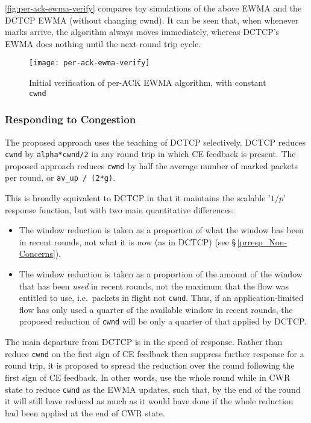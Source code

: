 \autoref{fig:per-ack-ewma-verify} compares toy simulations of the above EWMA and the DCTCP EWMA (without changing cwnd). It can be seen that, when whenever marks arrive, the algorithm always moves immediately, whereas DCTCP's EWMA does nothing until the next round trip cycle.
\begin{figure}
	\texttt{[image: per-ack-ewma-verify]}
	\caption{Initial verification of per-ACK EWMA algorithm, with constant \texttt{cwnd}}\label{fig:per-ack-ewma-verify}
\end{figure}

\subsubsection{Responding to Congestion}\label{prresp_congestion_response}

The proposed approach uses the teaching of DCTCP selectively. DCTCP reduces \texttt{cwnd} by \texttt{alpha*cwnd/2} in any round trip in which CE feedback is present. The proposed approach reduces \texttt{cwnd} by half the average number of marked packets per round, or \texttt{av\_up / (2*g)}. 

This is broadly equivalent to DCTCP in that it maintains the scalable '\(1/p\)' response function, but with two main quantitative differences:
\begin{itemize}[nosep]
	\item The window reduction is taken as a proportion of what the window has been in recent rounds, not what it is now (as in DCTCP) (see \S\,\ref{prresp_Non-Concerns}).
	\item The window reduction is taken as a proportion of the amount of the window that has been \emph{used} in recent rounds, not the maximum that the flow was entitled to use, i.e.\ packets in flight not \texttt{cwnd}. Thus, if an application-limited flow has only used a quarter of the available window in recent rounds, the proposed reduction of \texttt{cwnd} will be only a quarter of that applied by DCTCP.
\end{itemize}

The main departure from DCTCP is in the speed of response. Rather than reduce  \texttt{cwnd} on the first sign of CE feedback then suppress further response for a round trip, it is proposed to spread the reduction over the round following the first sign of CE feedback. In other words, use the whole round while in CWR state to reduce \texttt{cwnd} as the EWMA updates, such that, by the end of the round it will still have reduced as much as it would have done if the whole reduction had been applied at the end of CWR state.

